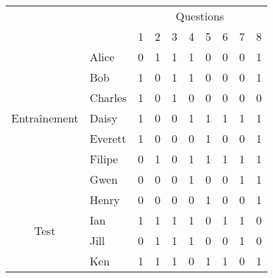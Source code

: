 \documentclass{standalone}
\newcommand\validation[1]{\textcolor{black!30}{#1}}
\begin{document}
\begin{tabular}{clcccccccc} \toprule
& & \multicolumn{8}{c}{Questions}\\
& & 1 & 2 & \validation3 & 4 & \validation5 & 6 & 7 & \validation8\\ \midrule
\multirow{7}{*}{Entraînement} & Alice & 0 & 1 & 1 & 1 & 0 & 0 & 0 & 1\\
& Bob & 1 & 0 & 1 & 1 & 0 & 0 & 0 & 1\\
& Charles & 1 & 0 & 1 & 0 & 0 & 0 & 0 & 0\\
& Daisy & 1 & 0 & 0 & 1 & 1 & 1 & 1 & 1\\
& Everett & 1 & 0 & 0 & 0 & 1 & 0 & 0 & 1\\
& Filipe & 0 & 1 & 0 & 1 & 1 & 1 & 1 & 1\\
& Gwen & 0 & 0 & 0 & 1 & 0 & 0 & 1 & 1\\ \midrule
\multirow{4}{*}{Test} & Henry & 0 & 0 & \validation0 & 0 & \validation1 & 0 & 0 & \validation1\\
& Ian & 1 & 1 & \validation1 & 1 & \validation0 & 1 & 1 & \validation0\\
& Jill & 0 & 1 & \validation1 & 1 & \validation0 & 0 & 1 & \validation0\\
& Ken & 1 & 1 & \validation1 & 0 & \validation1 & 1 & 0 & \validation1\\ \bottomrule
\end{tabular}
\end{document}
